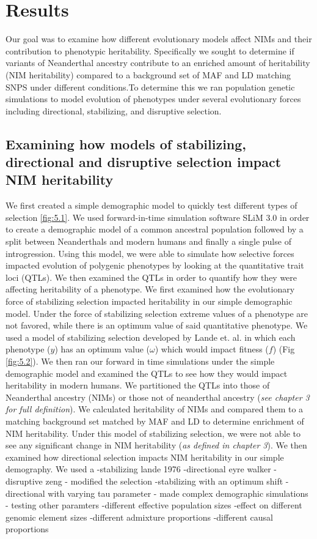 \section{Results}
Our goal was to examine how different evolutionary models affect NIMs and their contribution to phenotypic heritability. Specifically we sought to determine if variants of Neanderthal ancestry contribute to an enriched amount of heritability (NIM heritability) compared to a background set of MAF and LD matching SNPS under different conditions.To determine this we ran population genetic simulations to model evolution of phenotypes under several evolutionary forces including directional, stabilizing, and disruptive selection. 
\subsection{Examining how models of stabilizing, directional and disruptive selection impact NIM heritability}
We first created a simple demographic model to quickly test different types of selection \ref{fig:5.1}. We used forward-in-time simulation software SLiM 3.0 \cite{haller2019slim} in order to create a demographic model of a common ancestral population followed by a split between Neanderthals and modern humans and finally a single pulse of introgression. Using this model, we were able to simulate how selective forces impacted evolution of polygenic phenotypes by looking at the quantitative trait loci (QTLs). We then examined the QTLs in order to quantify how they were affecting heritability of a phenotype.
We first examined how the evolutionary force of stabilizing selection impacted heritability in our simple demographic model. Under the force of stabilizing selection extreme values of a phenotype are not favored, while there is an optimum value of said quantitative phenotype. We used a model of stabilizing selection developed by Lande et. al. \cite{lande1976natural} in which each phenotype ($y$) has an optimum value ($\omega$) which would impact fitness ($f$) (Fig \ref{fig:5.2}). We then ran our forward in time simulations under the simple demographic model and examined the QTLs to see how they would impact heritability in modern humans. We partitioned the QTLs into those of Neanderthal ancestry (NIMs) or those not of neanderthal ancestry (\textit{see chapter 3 for full definition}). We calculated heritability of NIMs and compared them to a matching background set matched by MAF and LD to determine enrichment of NIM heritability. Under this model of stabilizing selection, we were not able to see any significant change in NIM heritability (\textit{as defined in chapter 3}).
We then examined how directional selection impacts NIM heritability in our simple demography. We used a 
    -stabilizing lande 1976
    -directional eyre walker
    -disruptive zeng
- modified the selection
    -stabilizing with an optimum shift
    -directional with varying tau parameter
- made complex demographic simulations
- testing other paramters
    -different effective population sizes
    -effect on different genomic element sizes
    -different admixture proportions
    -different causal proportions 
